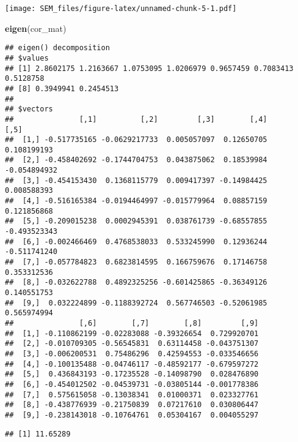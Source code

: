 \documentclass[]{article}
\newenvironment{Shaded}{\begin{snugshade}}{\end{snugshade}}
\newcommand{\KeywordTok}[1]{\textcolor[rgb]{0.13,0.29,0.53}{\textbf{#1}}}
\newcommand{\NormalTok}[1]{#1}
\newcommand{\OperatorTok}[1]{\textcolor[rgb]{0.81,0.36,0.00}{\textbf{#1}}}
\begin{document}
\texttt{[image: SEM\_files/figure-latex/unnamed-chunk-5-1.pdf]}

\begin{Shaded}
\begin{Highlighting}[]
\KeywordTok{eigen}\NormalTok{(cor_mat)}
\end{Highlighting}
\end{Shaded}

\begin{verbatim}
## eigen() decomposition
## $values
## [1] 2.8602175 1.2163667 1.0753095 1.0206979 0.9657459 0.7083413 0.5128758
## [8] 0.3949941 0.2454513
## 
## $vectors
##               [,1]          [,2]         [,3]        [,4]         [,5]
##  [1,] -0.517735165 -0.0629217733  0.005057097  0.12650705  0.108199193
##  [2,] -0.458402692 -0.1744704753  0.043875062  0.18539984 -0.054894932
##  [3,] -0.454153430  0.1368115779  0.009417397 -0.14984425  0.008588393
##  [4,] -0.516165384 -0.0194464997 -0.015779964  0.08857159  0.121856868
##  [5,] -0.209015238  0.0002945391  0.038761739 -0.68557855 -0.493523343
##  [6,] -0.002466469  0.4768538033  0.533245990  0.12936244 -0.511741240
##  [7,] -0.057784823  0.6823814595  0.166759676  0.17146758  0.353312536
##  [8,] -0.032622788  0.4892325256 -0.601425865 -0.36349126  0.140551753
##  [9,]  0.032224899 -0.1188392724  0.567746503 -0.52061985  0.565974994
##               [,6]        [,7]        [,8]         [,9]
##  [1,] -0.110862199 -0.02283088 -0.39326654  0.729920701
##  [2,] -0.010709305 -0.56545831  0.63114458 -0.043751307
##  [3,] -0.006200531  0.75486296  0.42594553 -0.033546656
##  [4,] -0.100135488 -0.04746117 -0.48592177 -0.679597272
##  [5,]  0.436843193 -0.17235528 -0.14098790  0.028476890
##  [6,] -0.454012502 -0.04539731 -0.03805144 -0.001778386
##  [7,]  0.575615058 -0.13038341  0.01000371  0.023327761
##  [8,] -0.438776939 -0.21750839  0.07217610  0.030806447
##  [9,] -0.238143018 -0.10764761  0.05304167  0.004055297
\end{verbatim}

\begin{Shaded}
\end{Shaded}

\begin{verbatim}
## [1] 11.65289
\end{verbatim}
\end{document}
